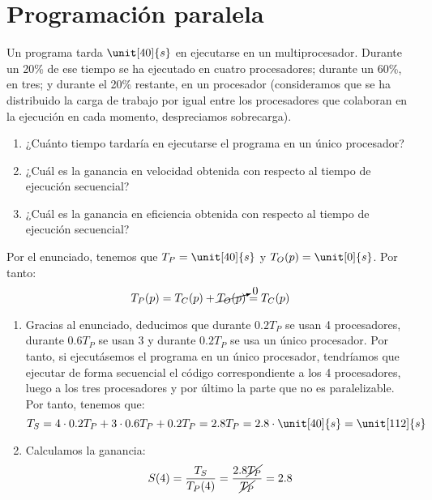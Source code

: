 \section{Programación paralela}

\begin{ejercicio}
    Un programa tarda $\unit[40]{s}$ en ejecutarse en un multiprocesador. Durante un 20\% de ese tiempo se
    ha ejecutado en cuatro procesadores; durante un 60\%, en tres; y durante el 20\% restante, en un procesador
    (consideramos que se ha distribuido la carga de trabajo por igual entre los procesadores que colaboran en la
    ejecución en cada momento, despreciamos sobrecarga).
    \begin{enumerate}
        \item ¿Cuánto tiempo tardaría en ejecutarse el programa
        en un único procesador?
        \item ¿Cuál es la ganancia en velocidad obtenida con respecto al tiempo de ejecución
        secuencial?
        \item ¿Cuál es la ganancia en eficiencia obtenida con respecto al tiempo de ejecución
        secuencial?
    \end{enumerate}

    Por el enunciado, tenemos que $T_P=\unit[40]{s}$ y $T_O(p)=\unit[0]{s}$. Por tanto:
        \begin{equation*}
            T_P(p) = T_C(p) + \cancelto{0}{T_O(p)} = T_C(p)
        \end{equation*}
    \begin{enumerate}
        \item
        Gracias al enunciado, deducimos que durante $0.2T_P$ se usan 4 procesadores,
        durante $0.6T_P$ se usan 3 y durante $0.2T_P$ se usa un único procesador.
        Por tanto, si ejecutásemos el programa en un único procesador, tendríamos
        que ejecutar de forma secuencial el código correspondiente a los 4 procesadores, luego a los tres procesadores y por último la parte que no es paralelizable.
        Por tanto, tenemos que:
        \begin{equation*}
            T_S = 4\cdot 0.2T_P + 3\cdot 0.6T_P + 0.2T_P = 2.8T_P = 2.8 \cdot \unit[40]{s} = \unit[112]{s}
        \end{equation*}

        \item Calculamos la ganancia:
        \begin{equation*}
            S(4) = \dfrac{T_S}{T_P(4)} = \dfrac{2.8\cancel{T_P}}{\cancel{T_P}} = 2.8 
        \end{equation*}


\end{enumerate}
\end{ejercicio}
